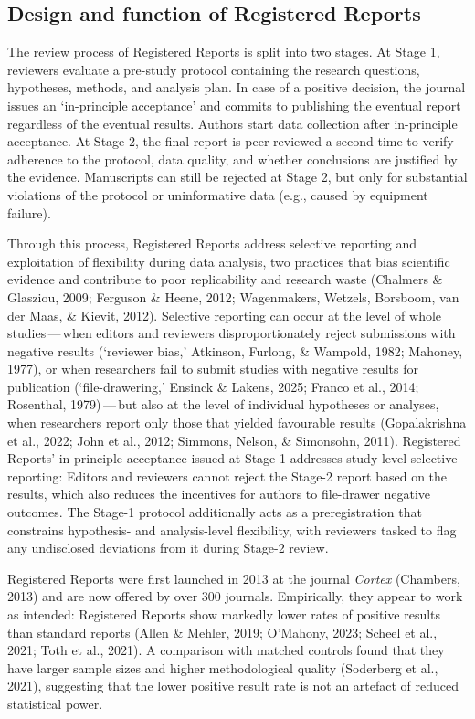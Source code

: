 \documentclass[
  british,
  a4paper,
  ,man,floatsintext]{apa6}
\begin{document}
\subsection{Design and function of Registered Reports}\label{design-and-function-of-registered-reports}

The review process of Registered Reports is split into two stages.
At Stage 1, reviewers evaluate a pre-study protocol containing the research questions, hypotheses, methods, and analysis plan.
In case of a positive decision, the journal issues an `in-principle acceptance' and commits to publishing the eventual report regardless of the eventual results.
Authors start data collection after in-principle acceptance.
At Stage 2, the final report is peer-reviewed a second time to verify adherence to the protocol, data quality, and whether conclusions are justified by the evidence.
Manuscripts can still be rejected at Stage 2, but only for substantial violations of the protocol or uninformative data (e.g., caused by equipment failure).

Through this process, Registered Reports address selective reporting and exploitation of flexibility during data analysis, two practices that bias scientific evidence and contribute to poor replicability and research waste (Chalmers \& Glasziou, 2009; Ferguson \& Heene, 2012; Wagenmakers, Wetzels, Borsboom, van der Maas, \& Kievit, 2012).
Selective reporting can occur at the level of whole studies\(\,\)---\(\,\)when editors and reviewers disproportionately reject submissions with negative results (`reviewer bias,' Atkinson, Furlong, \& Wampold, 1982; Mahoney, 1977), or when researchers fail to submit studies with negative results for publication (`file-drawering,' Ensinck \& Lakens, 2025; Franco et al., 2014; Rosenthal, 1979)\(\,\)---\(\,\)but also at the level of individual hypotheses or analyses, when researchers report only those that yielded favourable results (Gopalakrishna et al., 2022; John et al., 2012; Simmons, Nelson, \& Simonsohn, 2011).
Registered Reports' in-principle acceptance issued at Stage 1 addresses study-level selective reporting:
Editors and reviewers cannot reject the Stage-2 report based on the results, which also reduces the incentives for authors to file-drawer negative outcomes.
The Stage-1 protocol additionally acts as a preregistration that constrains hypothesis- and analysis-level flexibility, with reviewers tasked to flag any undisclosed deviations from it during Stage-2 review.

Registered Reports were first launched in 2013 at the journal \emph{Cortex} (Chambers, 2013) and are now offered by over 300 journals.
Empirically, they appear to work as intended:
Registered Reports show markedly lower rates of positive results than standard reports (Allen \& Mehler, 2019; O'Mahony, 2023; Scheel et al., 2021; Toth et al., 2021).
A comparison with matched controls found that they have larger sample sizes and higher methodological quality (Soderberg et al., 2021), suggesting that the lower positive result rate is not an artefact of reduced statistical power.
\end{document}
